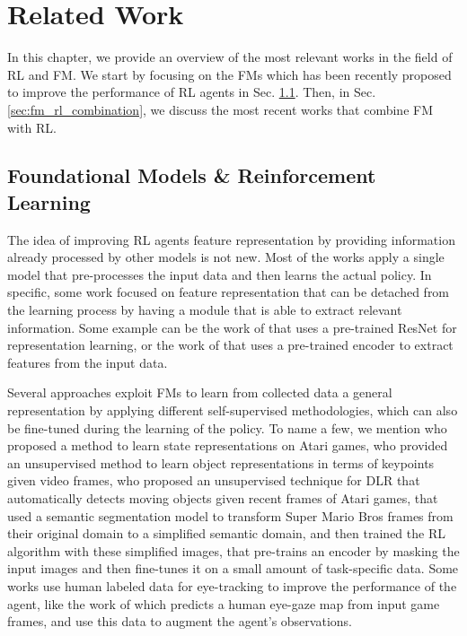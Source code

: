
\chapter{Related Work}
\label{ch:related_work}
In this chapter, we provide an overview of the most relevant works in the field of RL and FM\@.
We start by focusing on the FMs which has been recently proposed to improve the performance of RL agents in Sec. \ref{sec:fm_rl}.
Then, in Sec. \ref{sec:fm_rl_combination}, we discuss the most recent works that combine FM with RL\@.

\section{Foundational Models \& Reinforcement Learning}\label{sec:fm_rl}
The idea of improving RL agents feature representation by providing information already processed by other models is not new.
Most of the works apply a single model that pre-processes the input data and then learns the actual policy.
In specific, some work focused on feature representation that can be detached from the learning process by having a module that is able to extract relevant information.
Some example can be the work of \citet{shah2021rrl} that uses a pre-trained ResNet for representation learning, or the work of \citet{yuan2022pre} that uses a pre-trained encoder to extract features from the input data.

Several approaches exploit FMs to learn from collected data a general representation by applying different self-supervised methodologies, which can also be fine-tuned during the learning of the policy.
To name a few, we mention \citet{anand2019unsupervised} who proposed a method to learn state representations on Atari games, \citet{kulkarni2019unsupervised} who provided an unsupervised method to learn object representations in terms of keypoints given video frames, \citet{goel2018unsupervised} who proposed an unsupervised technique for DLR that automatically detects moving objects given recent frames of Atari games, \citet{montalvo2023exploiting} that used a semantic segmentation model to transform Super Mario Bros frames from their original domain to a simplified semantic domain, and then trained the RL algorithm with these simplified images, \citet{xiao2022masked} that pre-trains an encoder by masking the input images and then fine-tunes it on a small amount of task-specific data.
Some works use human labeled data for eye-tracking \citep{zhang2020atari} to improve the performance of the agent, like the work of \citet{thammineni2023selective} which predicts a human eye-gaze map from input game frames, and use this data to augment the agent's observations.

